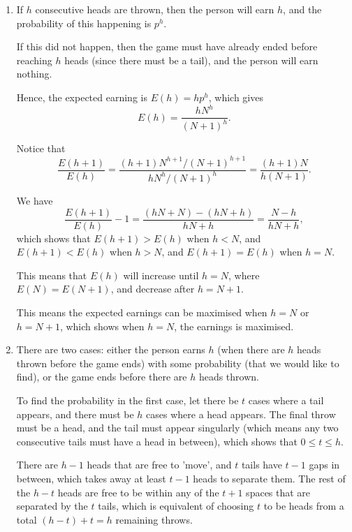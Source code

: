 \Question{\currfilebase}

\begin{enumerate}
    \item If \(h\) consecutive heads are thrown, then the person will earn \textsterling \(h\), and the probability of this happening is \(p^h\).

          If this did not happen, then the game must have already ended before reaching \(h\) heads (since there must be a tail), and the person will earn nothing.

          Hence, the expected earning is \(E(h) = h p^h\), which gives
          \[
              E(h) = \frac{h N^h}{(N + 1)^h}.
          \]

          Notice that
          \[
              \frac{E(h + 1)}{E(h)} = \frac{(h + 1) N^{h + 1} / (N + 1)^{h + 1}}{h N^h / (N + 1)^h} = \frac{(h + 1) N}{h (N + 1)}.
          \]

          We have
          \[
              \frac{E(h + 1)}{E(h)} - 1 = \frac{(hN + N) - (hN + h)}{hN + h} = \frac{N - h}{hN + h},
          \]
          which shows that \(E(h + 1) > E(h)\) when \(h < N\), and \(E(h + 1) < E(h)\) when \(h > N\), and \(E(h + 1) = E(h)\) when \(h = N\).

          This means that \(E(h)\) will increase until \(h = N\), where \(E(N) = E(N + 1)\), and decrease after \(h = N + 1\).

          This means the expected earnings can be maximised when \(h = N\) or \(h = N + 1\), which shows when \(h = N\), the earnings is maximised.

    \item There are two cases: either the person earns \textsterling \(h\) (when there are \(h\) heads thrown before the game ends) with some probability (that we would like to find), or the game ends before there are \(h\) heads thrown.

          To find the probability in the first case, let there be \(t\) cases where a tail appears, and there must be \(h\) cases where a head appears. The final throw must be a head, and the tail must appear singularly (which means any two consecutive tails must have a head in between), which shows that \(0 \leq t \leq h\).

          There are \(h - 1\) heads that are free to 'move', and \(t\) tails have \(t - 1\) gaps in between, which takes away at least \(t - 1\) heads to separate them. The rest of the \(h - t\) heads are free to be within any of the \(t + 1\) spaces that are separated by the \(t\) tails, which is equivalent of choosing \(t\) to be heads from a total \((h - t) + t = h\) remaining throws.


\end{enumerate}

